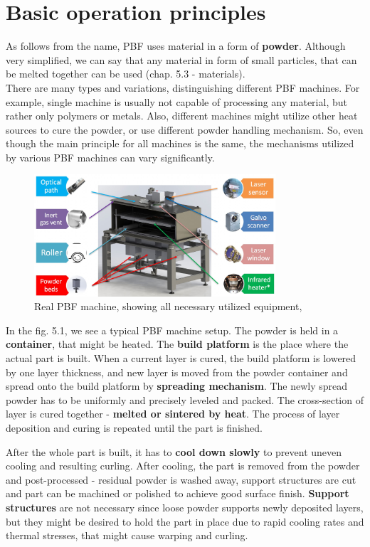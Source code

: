 \documentclass[a4paper, twoside, 11pt]{report}
\begin{document}
\section{Basic operation principles}
As follows from the name, PBF uses material in a form of \textbf{powder}. Although very simplified, we can say that any material in form of small particles, that can be melted together can be used (chap. 5.3 - materials).\\
	There are many types and variations, distinguishing different PBF machines. For example, single machine is usually not capable of processing any material, but rather only polymers or metals. Also, different machines might utilize other heat sources to cure the powder, or use different powder handling mechanism. So, even though the main principle for all machines is the same, the mechanisms utilized by various PBF machines can vary significantly.
\\
\begin{figure}[b]
	\centering
 	\includegraphics[width=0.8\textwidth]{PBFMachine}
	\caption{Real PBF machine, showing all necessary utilized equipment, \cite{unconn} }
\end{figure}
In the fig. 5.1, we see a typical PBF machine setup. The powder is held in a \textbf{container}, that might be heated. The \textbf{build platform} is the place where the actual part is built. When a current layer is cured, the build platform is lowered by one layer thickness, and new layer is moved from the powder container and spread onto the build platform by \textbf{spreading mechanism}. The newly spread powder has to be uniformly and precisely leveled and packed. The cross-section of layer is cured together - \textbf{melted or sintered by heat}. The process of layer deposition and curing is repeated until the part is finished.

	After the whole part is built, it has to \textbf{cool down slowly} to prevent uneven cooling and resulting curling. After cooling, the part is removed from the powder and post-processed - residual powder is washed away, support structures are cut and part can be machined or polished to achieve good surface finish. \textbf{Support structures} are not necessary since loose powder supports newly deposited layers, but they might be desired to hold the part in place due to rapid cooling rates and thermal stresses, that might cause warping and curling.
	
\end{document}
